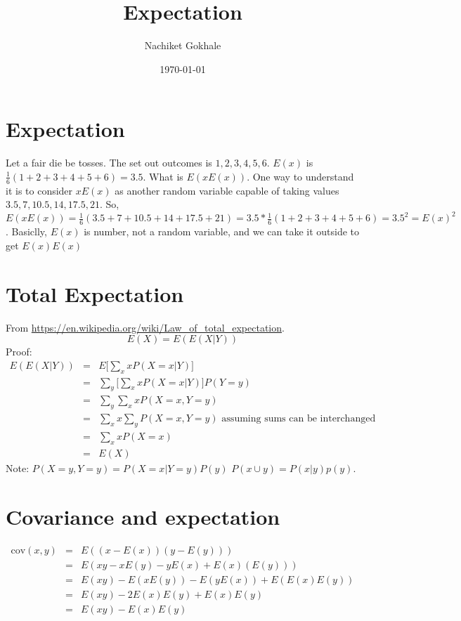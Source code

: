 \documentclass{article}
\newcommand{\beq}{\begin{equation}}
\newcommand{\eeq}{\end{equation}}
\newcommand{\ber}{\begin{eqnarray}}
\newcommand{\eer}{\end{eqnarray}}
\begin{document}
\title{Expectation}
\author{Nachiket Gokhale}
\date{\today}
\maketitle
\section{Expectation}
Let a fair die be tosses. The set out outcomes is ${1,2,3,4,5,6}$. $E(x)$ is $\frac{1}{6}(1+2+3+4+5+6)=3.5$. What is $E(xE(x))$. One way to understand it is to consider $xE(x)$ as another random variable capable of taking values ${3.5,7,10.5,14,17.5,21}$. So, $E(xE(x))=\frac{1}{6}(3.5+7+10.5+14+17.5+21)=3.5*\frac{1}{6}(1+2+3+4+5+6)=3.5^2=E(x)^2$. Basiclly, $E(x)$ is number, not a random variable, and we can take it outside to get $E(x)E(x)$ 
\section{Total Expectation}
From \url{https://en.wikipedia.org/wiki/Law_of_total_expectation}.
\beq
E(X) = E(E(X|Y))
\eeq
Proof:
\ber
E(E(X|Y)) &=& E\Big[\sum_{x}xP(X=x|Y)\Big] \\
&=& \sum_y\Big[\sum_{x}xP(X=x|Y)\Big]P(Y=y) \\
&=& \sum_y\sum_xxP(X=x,Y=y) \\
&=& \sum_x x \sum_yP(X=x,Y=y) \text{ assuming sums can be interchanged } \\
&=& \sum_x x P(X=x) \\
&=& E(X)
\eer
Note: $P(X=y,Y=y)=P(X=x|Y=y)P(y)$  $P(x\cup{y}) = P(x|y)p(y)$.
\section{Covariance and expectation}
\ber
\text{cov}(x,y) &=& E((x-E(x))(y-E(y))) \\
&=& E(xy - xE(y) - yE(x) + E(x)(E(y))) \\
&=& E(xy)- E(xE(y)) - E(yE(x)) + E(E(x)E(y)) \\
&=& E(xy) -2E(x)E(y) + E(x)E(y) \\
&=& E(xy) - E(x)E(y)
\eer
\end{document}
